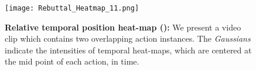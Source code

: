 \documentclass[10pt,twocolumn,letterpaper]{article}
\begin{document}
\iffalse
\begin{figure}[t]
\centering
\texttt{[image: Relative\_position.PNG]}
\caption{Relative temporal position heat-map (). The heat-map is defined by the center location of the instance (green line), and by its duration (red line). }
\label{fig:relative}
\end{figure}
\fi

\begin{figure}[t]
  \centering
  \texttt{[image: Rebuttal\_Heatmap\_11.png]}
  \caption{\textbf{Relative temporal position heat-map ():} We present a video clip which contains two overlapping action instances. The \textit{Gaussians} indicate the intensities of temporal heat-maps, which are centered at the mid point of each action, in time.}
  \label{fig:relative}
\end{figure}
\end{document}
